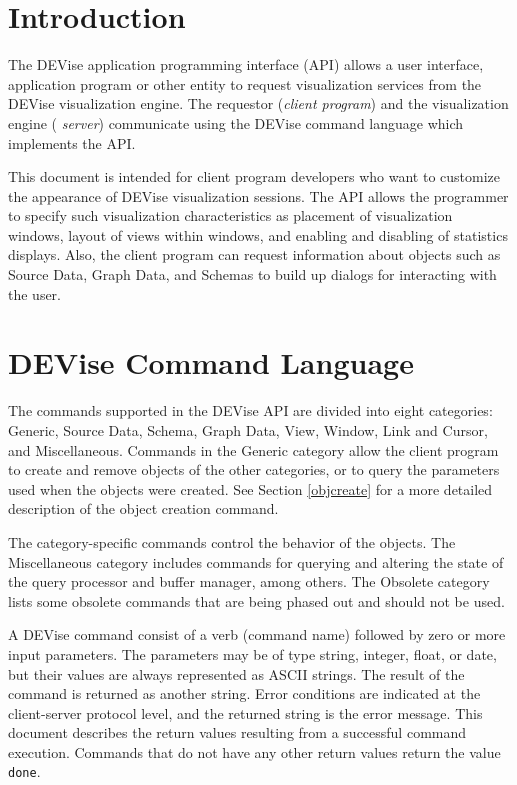 \section{Introduction}

The DEVise application programming interface (API) allows a user
interface, application program or other entity to request
visualization services from the DEVise visualization engine. The
requestor ({\em client program}) and the visualization engine ({\em
server}) communicate using the DEVise command language which
implements the API.

This document is intended for client program developers who want to
customize the appearance of DEVise visualization sessions. The API
allows the programmer to specify such visualization characteristics as
placement of visualization windows, layout of views within windows,
and enabling and disabling of statistics displays. Also, the client
program can request information about objects such as Source Data,
Graph Data, and Schemas to build up dialogs for interacting with the
user.

\section{DEVise Command Language}

The commands supported in the DEVise API are divided into eight
categories: Generic, Source Data, Schema, Graph Data, View, Window,
Link and Cursor, and Miscellaneous. Commands in the Generic category
allow the client program to create and remove objects of the other
categories, or to query the parameters used when the objects were
created. See Section \ref{objcreate} for a more detailed description
of the object creation command.

The category-specific commands control the behavior of the
objects. The Miscellaneous category includes commands for querying and
altering the state of the query processor and buffer manager, among
others. The Obsolete category lists some obsolete commands that are
being phased out and should not be used.

A DEVise command consist of a verb (command name) followed by zero or
more input parameters. The parameters may be of type string, integer,
float, or date, but their values are always represented as ASCII
strings. The result of the command is returned as another
string. Error conditions are indicated at the client-server protocol
level, and the returned string is the error message. This document
describes the return values resulting from a successful command
execution. Commands that do not have any other return values return
the value {\tt done}.

